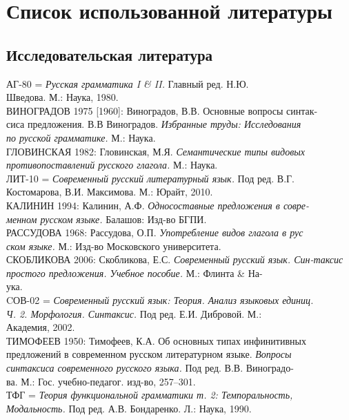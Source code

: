 \newcommand{\indenttext}{\hspace*{4ex}}
\newcommand{\cutline}{\\\indenttext}
\newcommand{\cutword}{-\cutline}

\section*{Список использованной литературы}
\setlength{\parindent}{0cm}
\begin{normalsize}
\subsection*{Исследовательская литература}
АГ-80 = \textit{Русская грамматика I \& II.} Главный ред. Н.Ю.\cutline Шведова. М.: Наука, 1980.\\
ВИНОГРАДОВ 1975 [1960]: Виноградов, В.В. Основные вопросы синтак\cutword сиса предложения. В.В Виноградов. \textit{Избранные труды: Исследования\cutline по русской грамматике.} М.: Наука.\\
ГЛОВИНСКАЯ 1982: Гловинская, М.Я. \textit{Семантические типы видовых\cutline противопоставлений русского глагола.} М.: Наука.\\
ЛИТ-10 = \textit{Современный русский литературный язык.} Под ред. В.Г.\cutline Костомарова, В.И. Максимова. М.: Юрайт, 2010.\\
КАЛИНИН 1994: Калинин, А.Ф. \textit{Односоставные предложения в совре\cutword менном русском языке.} Балашов: Изд-во БГПИ. \\
РАССУДОВА 1968: Рассудова, О.П. \textit{Употребление видов глагола в рус\cutline ском языке.} М.: Изд-во Московского университета.\\
СКОБЛИКОВА 2006: Скобликова, Е.С. \textit{Современный русский язык. Син-\indenttext таксис простого предложения. Учебное пособие.} М.: Флинта \& На\cutword ука.\\
CОВ-02 = \textit{Современный русский язык: Теория. Анализ языковых единиц.\cutline Ч. 2. Морфология. Синтаксис.} Под ред. Е.И. Дибровой. М.:\cutline Академия, 2002.\\
ТИМОФЕЕВ 1950: Тимофеев, К.А. Об основных типах инфинитивных \indenttext предложений в современном русском литературном языке. \textit{Вопросы \cutline синтаксиса современного русского языка.} Под ред. В.В. Виноградо\cutword ва. М.: Гос. учебно-педагог. изд-во, 257--301.\\
ТФГ = \textit{Теория функциональной грамматики т. 2: Темпоральность, \cutline Модальность.} Под ред. А.В. Бондаренко. Л.: Наука, 1990.\\
\\
\end{normalsize}